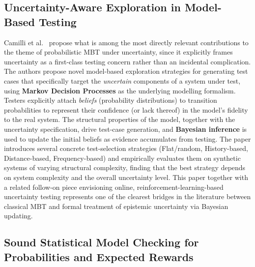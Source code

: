 \subsection{Uncertainty-Aware Exploration in Model-Based Testing}
\label{sec:lr_camilli}

Camilli et al.~\cite{camilli2021uncertainty} propose what is among the
most directly relevant contributions to the theme of probabilistic MBT
under uncertainty, since it explicitly frames uncertainty as a first-class
testing concern rather than an incidental complication.  The authors
propose novel model-based exploration strategies for generating test
cases that specifically target the \emph{uncertain} components of a
system under test, using \textbf{Markov Decision Processes} as the
underlying modelling formalism.  Testers explicitly attach
\emph{beliefs} (probability distributions) to transition probabilities
to represent their confidence (or lack thereof) in the model's fidelity
to the real system.  The structural properties of the model, together
with the uncertainty specification, drive test-case generation, and
\textbf{Bayesian inference} is used to update the initial beliefs as
evidence accumulates from testing.  The paper introduces several concrete
test-selection strategies (Flat/random, History-based, Distance-based,
Frequency-based) and empirically evaluates them on synthetic systems of
varying structural complexity, finding that the best strategy depends on
system complexity and the overall uncertainty level.  This paper together
with a related follow-on piece envisioning online,
reinforcement-learning-based uncertainty testing represents one of the
clearest bridges in the literature between classical MBT and formal
treatment of epistemic uncertainty via Bayesian updating.




\subsection{Sound Statistical Model Checking for Probabilities and Expected Rewards}
\label{sec:lr_budde}

